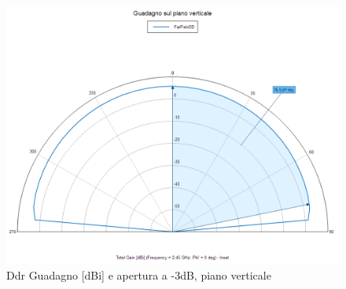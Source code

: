 \documentclass[twoside,twocolumn]{article}
\begin{document}
\begin{figure}[h!]
  \includegraphics[width=\linewidth]{A_verticale.png}
  \caption{Ddr Guadagno [dBi] e apertura a -3dB, piano verticale}
  \label{fig:A_verticale}
\end{figure}
\end{document}
